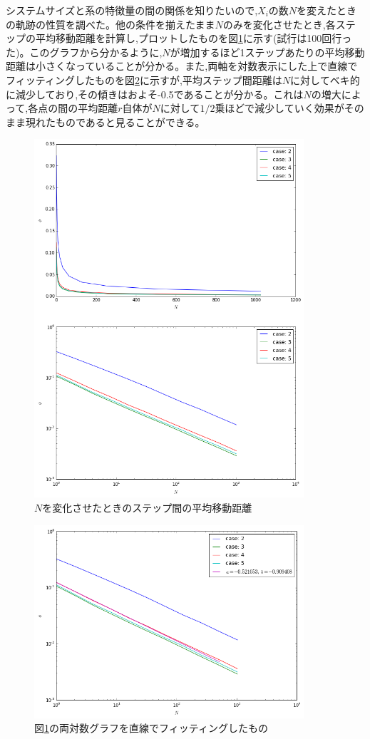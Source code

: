 システムサイズと系の特徴量の間の関係を知りたいので,$X_{i}$の数$N$を変えたときの軌跡の性質を調べた。他の条件を揃えたまま$N$のみを変化させたとき,各ステップの平均移動距離を計算し,プロットしたものを図\ref{fig:f13}に示す(試行は100回行った)。このグラフから分かるように,$N$が増加するほど1ステップあたりの平均移動距離は小さくなっていることが分かる。また,両軸を対数表示にした上で直線でフィッティングしたものを図\ref{fig:f14}に示すが,平均ステップ間距離は$N$に対してベキ的に減少しており,その傾きはおよそ-0.5であることが分かる。これは$N$の増大によって,各点の間の平均距離$r$自体が$N$に対して$1/2$乗ほどで減少していく効果がそのまま現れたものであると見ることができる。
\begin{figure}[H]
    \begin{center}
        \includegraphics[width=10cm]{../img/simple3_N_2.png}
        \caption{$N$を変化させたときのステップ間の平均移動距離}
        \label{fig:f13}
    \end{center}
\end{figure}
\begin{figure}[H]
    \begin{center}
        \includegraphics[width=10cm]{../img/simple3_N_2_fit.png}
        \caption{図\ref{fig:f13}の両対数グラフを直線でフィッティングしたもの}
        \label{fig:f14}
    \end{center}
\end{figure}

